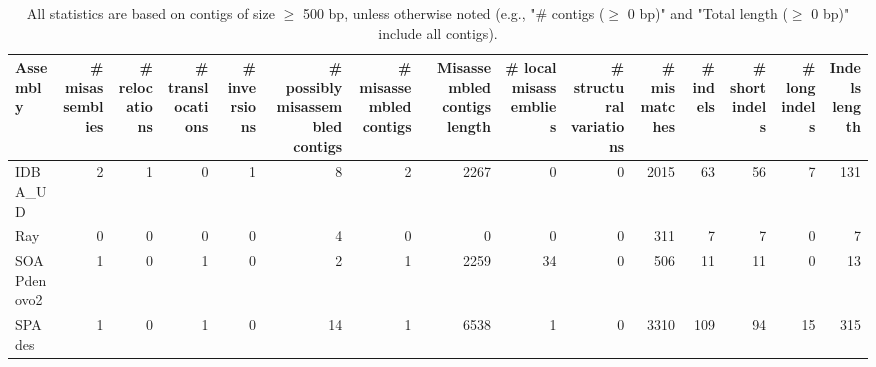 \documentclass[12pt,a4paper]{article}
\begin{document}
\begin{table}[ht]
\begin{center}
\caption{All statistics are based on contigs of size $\geq$ 500 bp, unless otherwise noted (e.g., "\# contigs ($\geq$ 0 bp)" and "Total length ($\geq$ 0 bp)" include all contigs).}
\begin{tabular}{|l*{14}{|r}|}
\hline
Assembly & \# misassemblies &     \# relocations &     \# translocations &     \# inversions & \# possibly misassembled contigs & \# misassembled contigs & Misassembled contigs length & \# local misassemblies & \# structural variations & \# mismatches & \# indels &     \# short indels &     \# long indels & Indels length \\ \hline
IDBA\_UD & 2 & 1 & 0 & 1 & 8 & 2 & 2267 & 0 & 0 & 2015 & 63 & 56 & 7 & 131 \\ \hline
Ray & 0 & 0 & 0 & 0 & 4 & 0 & 0 & 0 & 0 & 311 & 7 & 7 & 0 & 7 \\ \hline
SOAPdenovo2 & 1 & 0 & 1 & 0 & 2 & 1 & 2259 & 34 & 0 & 506 & 11 & 11 & 0 & 13 \\ \hline
SPAdes & 1 & 0 & 1 & 0 & 14 & 1 & 6538 & 1 & 0 & 3310 & 109 & 94 & 15 & 315 \\ \hline
\end{tabular}
\end{center}
\end{table}
\end{document}
